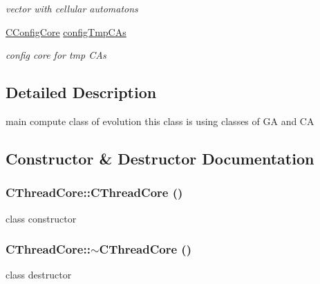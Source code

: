 \begin{DoxyCompactItemize}
\begin{DoxyCompactList}\small\item\em vector with cellular automatons \item\end{DoxyCompactList}\item 
\hypertarget{classCThreadCore_a97c80e8cf2c9e0461636a309d596438a}{
\hyperlink{classCConfigCore}{CConfigCore} \hyperlink{classCThreadCore_a97c80e8cf2c9e0461636a309d596438a}{configTmpCAs}}
\label{classCThreadCore_a97c80e8cf2c9e0461636a309d596438a}

\begin{DoxyCompactList}\small\item\em config core for tmp CAs \item\end{DoxyCompactList}\end{DoxyCompactItemize}


\subsection{Detailed Description}
main compute class of evolution this class is using classes of GA and CA 

\subsection{Constructor \& Destructor Documentation}
\hypertarget{classCThreadCore_a3bf4b7a3b3dab03741d538e35dcfb9dc}{
\subsubsection[{CThreadCore}]{\setlength{\rightskip}{0pt plus 5cm}CThreadCore::CThreadCore ()}}
\label{classCThreadCore_a3bf4b7a3b3dab03741d538e35dcfb9dc}
class constructor \hypertarget{classCThreadCore_a059d1d66522f2e611d83abafda575564}{
\subsubsection[{$\sim$CThreadCore}]{\setlength{\rightskip}{0pt plus 5cm}CThreadCore::$\sim$CThreadCore ()}}
\label{classCThreadCore_a059d1d66522f2e611d83abafda575564}
class destructor 

